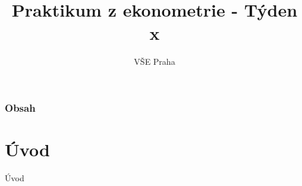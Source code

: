 \documentclass{beamer}
\title[Týden x]{Praktikum z ekonometrie - Týden x} %
\author{VŠE Praha} %
\institute[4EK417] %
{
\medskip
\textit{Tomáš Formánek} %
}
\date{} %
\begin{document}
\begin{frame}
\titlepage %
\end{frame}

\begin{frame}
\frametitle{Obsah} %
\tableofcontents %
\end{frame}

\section{Úvod}
\begin{frame}{Úvod}


\end{frame}
\end{document}
